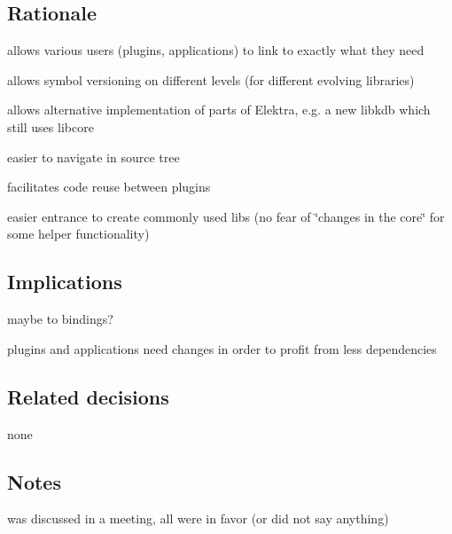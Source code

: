 \subsection*{Rationale}


\begin{DoxyItemize}
\item allows various users (plugins, applications) to link to exactly what they need
\item allows symbol versioning on different levels (for different evolving libraries)
\item allows alternative implementation of parts of Elektra, e.\+g. a new libkdb which still uses libcore
\item easier to navigate in source tree
\item facilitates code reuse between plugins
\item easier entrance to create commonly used libs (no fear of \char`\"{}changes in the core\char`\"{} for some helper functionality)
\end{DoxyItemize}

\subsection*{Implications}


\begin{DoxyItemize}
\item maybe to bindings?
\item plugins and applications need changes in order to profit from less dependencies
\end{DoxyItemize}

\subsection*{Related decisions}


\begin{DoxyItemize}
\item none
\end{DoxyItemize}

\subsection*{Notes}


\begin{DoxyItemize}
\item was discussed in a meeting, all were in favor (or did not say anything)
\end{DoxyItemize}

